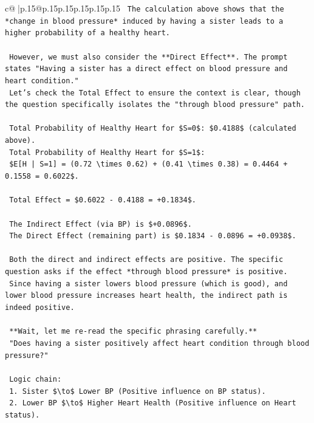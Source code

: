 \documentclass{article}
\begin{document}
{\begin{supertabular}{c@{$\;$}|p{.15\linewidth}@{}p{.15\linewidth}p{.15\linewidth}p{.15\linewidth}p{.15\linewidth}p{.15\linewidth}}
{{{\texttt{    The calculation above shows that the *change in blood pressure* induced by having a sister leads to a higher probability of a healthy heart.} \\
\\ 
\texttt{    However, we must also consider the **Direct Effect**. The prompt states "Having a sister has a direct effect on blood pressure and heart condition."} \\
\texttt{    Let's check the Total Effect to ensure the context is clear, though the question specifically isolates the "through blood pressure" path.} \\
\\ 
\texttt{    Total Probability of Healthy Heart for \$S=0\$: \$0.4188\$ (calculated above).} \\
\texttt{    Total Probability of Healthy Heart for \$S=1\$:} \\
\texttt{    \$E{[}H | S=1{]} = (0.72 \textbackslash{}times 0.62) + (0.41 \textbackslash{}times 0.38) = 0.4464 + 0.1558 = 0.6022\$.} \\
\\ 
\texttt{    Total Effect = \$0.6022 {-} 0.4188 = +0.1834\$.} \\
\\ 
\texttt{    The Indirect Effect (via BP) is \$+0.0896\$.} \\
\texttt{    The Direct Effect (remaining part) is \$0.1834 {-} 0.0896 = +0.0938\$.} \\
\\ 
\texttt{    Both the direct and indirect effects are positive. The specific question asks if the effect *through blood pressure* is positive.} \\
\texttt{    Since having a sister lowers blood pressure (which is good), and lower blood pressure increases heart health, the indirect path is indeed positive.} \\
\\ 
\texttt{    **Wait, let me re{-}read the specific phrasing carefully.**} \\
\texttt{    "Does having a sister positively affect heart condition through blood pressure?"} \\
\\ 
\texttt{    Logic chain:} \\
\texttt{    1. Sister \$\textbackslash{}to\$ Lower BP (Positive influence on BP status).} \\
\texttt{    2. Lower BP \$\textbackslash{}to\$ Higher Heart Health (Positive influence on Heart status).} \\
}}}
\end{supertabular}}
\end{document}
